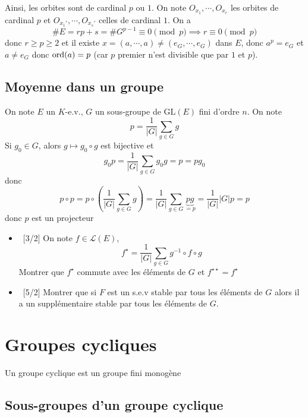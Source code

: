 Ainsi, les orbites sont de cardinal $p$ ou $1$. On note $O_{x_1}, \cdots, O_{x_r}$ les orbites de cardinal $p$ et $O_{x_1'}, \cdots, O_{x_s'}$ celles de cardinal $1$. On a \[
    \#E=rp+s=\#G^{p-1}\equiv 0\pmod p \implies r\equiv 0\pmod p
\]
donc $r\geq p\geq 2$ et il existe $x=(a, \cdots, a)\neq (e_G, \cdots, e_G)$ dans $E$, donc $a^p=e_G$ et $a\neq e_G$ donc $\mathrm{ord} (a)=p$ (car $p$ premier n'est divisible que par $1$ et $p$).

\subsection{Moyenne dans un groupe}

On note $E$ un $K$-e.v., $G$ un sous-groupe de $\mathrm{GL}(E)$ fini d'ordre $n$. On note \[
    p= \frac{1}{|G|} \sum_{g\in G} g
\]
Si $g_0\in G$, alors $g\longmapsto g_0\circ g$ est bijective et \[
    g_0 p=\frac1{|G|}\sum_{g\in G}g_0 g=p=pg_0
\]
donc \[
    p\circ p=p\circ \left( \frac1{|G|}\sum_{g\in G} g\right)=\frac1{|G|}\sum_{g\in G}\underbrace{pg}_{=p}=\frac1{|G|}|G|p=p
\]
donc $p$ est un projecteur


\begin{exo}
    \begin{itemize}
        \item ~[3/2] On note $f\in \mathcal L(E)$, \[
                f^\star = \frac1{|G|}\sum_{g\in G}g^{-1}\circ f\circ g
            \]
            Montrer que $f^\star$ commute avec les éléments de $G$ et $f^{\star\star}=f^\star$
        \item ~[5/2] Montrer que si $F$ est un s.e.v stable par tous les éléments de $G$ alors il a un supplémentaire stable par tous les éléments de $G$.
    \end{itemize}
\end{exo}

\section{Groupes cycliques}

\begin{dfn}
    Un groupe cyclique est un groupe fini monogène
\end{dfn}

\subsection{Sous-groupes d'un groupe cyclique}

